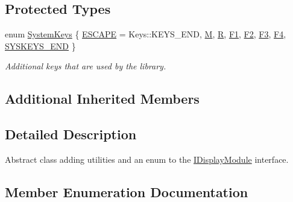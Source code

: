 \subsection*{Protected Types}
\begin{DoxyCompactItemize}
\item 
enum \mbox{\hyperlink{classArcade_1_1Display_1_1ADisplayModule_ac438501e449afdad548b42ee2897eabc}{System\+Keys}} \{ \newline
\mbox{\hyperlink{classArcade_1_1Display_1_1ADisplayModule_ac438501e449afdad548b42ee2897eabcaec77d8d61e07091f07a87c421418ace5}{E\+S\+C\+A\+PE}} = Keys\+::K\+E\+Y\+S\+\_\+\+E\+ND, 
\mbox{\hyperlink{classArcade_1_1Display_1_1ADisplayModule_ac438501e449afdad548b42ee2897eabca30553e92fff93326b597d5e30fcd3190}{M}}, 
\mbox{\hyperlink{classArcade_1_1Display_1_1ADisplayModule_ac438501e449afdad548b42ee2897eabca5cfd2758b660590ae37c398523bca7d3}{R}}, 
\mbox{\hyperlink{classArcade_1_1Display_1_1ADisplayModule_ac438501e449afdad548b42ee2897eabca85d0bec2e53fa1d75ce7d2f9b7161109}{F1}}, 
\newline
\mbox{\hyperlink{classArcade_1_1Display_1_1ADisplayModule_ac438501e449afdad548b42ee2897eabca7e7e50fdd21c8578aaff3b5ac06feee3}{F2}}, 
\mbox{\hyperlink{classArcade_1_1Display_1_1ADisplayModule_ac438501e449afdad548b42ee2897eabca3f9d828751f22e3b00098211aa71fa59}{F3}}, 
\mbox{\hyperlink{classArcade_1_1Display_1_1ADisplayModule_ac438501e449afdad548b42ee2897eabca396a9fef58850e9f0bfd58a6eaa67527}{F4}}, 
\mbox{\hyperlink{classArcade_1_1Display_1_1ADisplayModule_ac438501e449afdad548b42ee2897eabcaab87e6aa5e3f487447ae3dd3f9d1a31c}{S\+Y\+S\+K\+E\+Y\+S\+\_\+\+E\+ND}}
 \}
\begin{DoxyCompactList}\small\item\em Additional keys that are used by the library. \end{DoxyCompactList}\end{DoxyCompactItemize}
\subsection*{Additional Inherited Members}


\subsection{Detailed Description}
Abstract class adding utilities and an enum to the \mbox{\hyperlink{classArcade_1_1Display_1_1IDisplayModule}{I\+Display\+Module}} interface. 

\subsection{Member Enumeration Documentation}
\mbox{\label{classArcade_1_1Display_1_1ADisplayModule_ac438501e449afdad548b42ee2897eabc}} 
